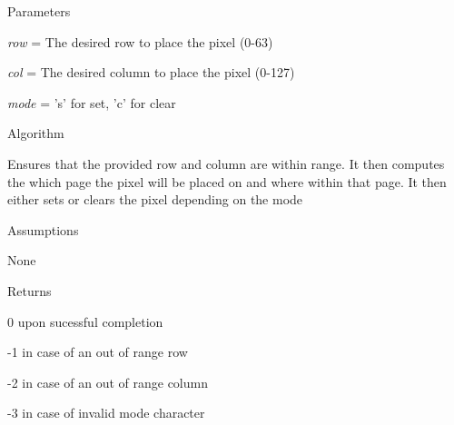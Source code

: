 \begin{DoxyParagraph}{Parameters}

\begin{DoxyItemize}
\item {\itshape row} = The desired row to place the pixel (0-\/63)
\item {\itshape col} = The desired column to place the pixel (0-\/127)
\item {\itshape mode} = 's' for set, 'c' for clear
\end{DoxyItemize}
\end{DoxyParagraph}
\begin{DoxyParagraph}{Algorithm}

\begin{DoxyItemize}
\item Ensures that the provided row and column are within range. It then computes the which page the pixel will be placed on and where within that page. It then either sets or clears the pixel depending on the mode
\end{DoxyItemize}
\end{DoxyParagraph}
\begin{DoxyParagraph}{Assumptions}

\begin{DoxyItemize}
\item None
\end{DoxyItemize}
\end{DoxyParagraph}
\begin{DoxyReturn}{Returns}

\begin{DoxyItemize}
\item 0 upon sucessful completion
\item -\/1 in case of an out of range row
\item -\/2 in case of an out of range column
\item -\/3 in case of invalid mode character 
\end{DoxyItemize}
\end{DoxyReturn}
